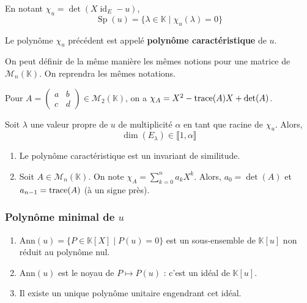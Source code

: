 	\begin{proposition}
		En notant $\chi_u = \det(X \operatorname{id}_E - u)$,
		\[ \operatorname{Sp}(u) = \{ \lambda \in \mathbb{K} \mid \chi_u(\lambda) = 0 \} \]
	\end{proposition}
	
	\begin{definition}
		Le polynôme $\chi_u$ précédent est appelé \textbf{polynôme caractéristique} de $u$.
	\end{definition}
	
	\begin{remark}
		On peut définir de la même manière les mêmes notions pour une matrice de $\mathcal{M}_n(\mathbb{K})$. On reprendra les mêmes notations.
	\end{remark}
	
	\begin{example}
		Pour $A = \begin{pmatrix} a & b \\ c & d \end{pmatrix} \in \mathcal{M}_2(\mathbb{K})$, on a $\chi_A = X^2 - \operatorname{trace}(A)X + \det(A)$.
	\end{example}
	
	\begin{proposition}
		Soit $\lambda$ une valeur propre de $u$ de multiplicité $\alpha$ en tant que racine de $\chi_u$. Alors,
		\[ \dim(E_\lambda) \in \llbracket 1, \alpha \rrbracket \]
	\end{proposition}
	
	
	\begin{proposition}
		\begin{enumerate}[label=(\roman*)]
			\item Le polynôme caractéristique est un invariant de similitude.
			\item Soit $A \in \mathcal{M}_n(\mathbb{K})$. On note $\chi_A = \sum_{k=0}^n a_k X^k$. Alors, $a_0 = \det(A)$ et $a_{n-1} = \operatorname{trace}(A)$ (à un signe près).
		\end{enumerate}
	\end{proposition}
		
	\subsubsection{Polynôme minimal de \texorpdfstring{$u$}{u}}
	
	
	\begin{lemma}
		\begin{enumerate}[label=(\roman*)]
			\item $\mathrm{Ann}(u) = \{ P \in \mathbb{K}[X] \mid P(u) = 0 \}$ est un sous-ensemble de $\mathbb{K}[u]$ non réduit au polynôme nul.
			\item $\mathrm{Ann}(u)$ est le noyau de $P \mapsto P(u)$ : c'est un idéal de $\mathbb{K}[u]$.
			\item Il existe un unique polynôme unitaire engendrant cet idéal.
		\end{enumerate}
	\end{lemma}
	
